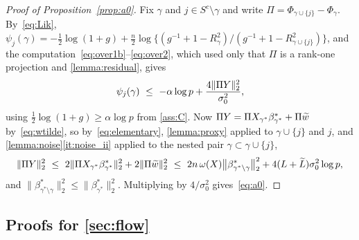 \begin{proof}[Proof of Proposition~\ref{prop:a0}]
    Fix $\gamma$ and $j\in S^{c}\setminus\gamma$ and write
    $\Pi=\Phi_{\gamma\cup\{j\}}-\Phi_\gamma$. By~\eqref{eq:Lik},
    $\psi_j(\gamma)=-\tfrac12\log(1+g)+\tfrac n2\log\{(g^{-1}
    +1-R^{2}_{\gamma})/(g^{-1}+1-R^{2}_{\gamma\cup\{j\}})\}$, and the
    computation~\eqref{eq:over1b}--\eqref{eq:over2}, which used only that
    $\Pi$ is a rank-one projection and \cref{lemma:residual}, gives
    \begin{equation*}
        \psi_j(\gamma)\ \leq\ -\alpha\log p
        +\frac{4\lVert\Pi Y\rVert_2^{2}}{\sigma_0^{2}} ,
    \end{equation*}
    using $\tfrac12\log(1+g)\geq\alpha\log p$ from \cref{ass:C}. Now
    $\Pi Y=\Pi X_{\gamma^{\ast}}\beta^{\ast}_{\gamma^{\ast}}+\Pi\widetilde w$ by~\eqref{eq:wtilde}, so
    by~\eqref{eq:elementary}, \cref{lemma:proxy} applied to
    $\gamma\cup\{j\}$ and $j$, and
    \cref{lemma:noise}\ref{it:noise_ii} applied to the nested pair
    $\gamma\subset\gamma\cup\{j\}$,
    \begin{equation*}
        \lVert\Pi Y\rVert_2^{2}
        \ \leq\ 2\lVert\Pi X_{\gamma^{\ast}}\beta^{\ast}_{\gamma^{\ast}}\rVert_2^{2}+2\lVert\Pi\widetilde w\rVert_2^{2}
        \ \leq\ 2n\,\omega(X)
        \bigl\|\beta^{\ast}_{\gamma^{\ast}\setminus\gamma}\bigr\|_2^{2}
        +4(L+\widetilde{L})\sigma_0^{2}\log p ,
    \end{equation*}
    and $\|\beta^{\ast}_{\gamma^{\ast}\setminus\gamma}\|_2^{2}
    \leq\|\beta^{\ast}_{\gamma^{\ast}}\|_2^{2}$. Multiplying by
    $4/\sigma_0^{2}$ gives~\eqref{eq:a0}.
\end{proof}

\subsection{Proofs for \cref{sec:flow}}
\label{sub:appflow}

